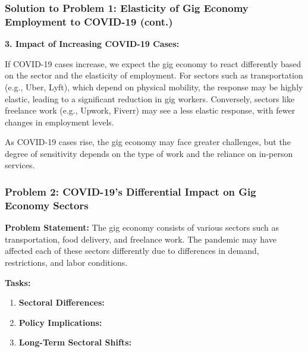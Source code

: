 \documentclass{beamer}
\begin{document}
\begin{frame}
\frametitle{Solution to Problem 1: Elasticity of Gig Economy Employment to COVID-19 (cont.)}
\textbf{3. Impact of Increasing COVID-19 Cases:}

If COVID-19 cases increase, we expect the gig economy to react differently based on the sector and the elasticity of employment. For sectors such as transportation (e.g., Uber, Lyft), which depend on physical mobility, the response may be highly elastic, leading to a significant reduction in gig workers. Conversely, sectors like freelance work (e.g., Upwork, Fiverr) may see a less elastic response, with fewer changes in employment levels.

As COVID-19 cases rise, the gig economy may face greater challenges, but the degree of sensitivity depends on the type of work and the reliance on in-person services.

\end{frame}

\begin{frame}
\frametitle{Problem 2: COVID-19’s Differential Impact on Gig Economy Sectors}
\textbf{Problem Statement:}
The gig economy consists of various sectors such as transportation, food delivery, and freelance work. The pandemic may have affected each of these sectors differently due to differences in demand, restrictions, and labor conditions.

\textbf{Tasks:}
\begin{enumerate}
    \item \textbf{Sectoral Differences:}
    \item \textbf{Policy Implications:}
    \item \textbf{Long-Term Sectoral Shifts:}
\end{enumerate}
\end{frame}
\end{document}
